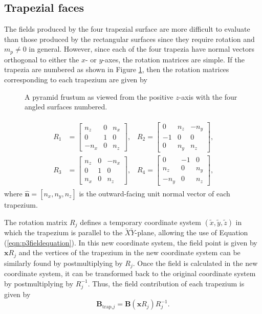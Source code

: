 \subsection{Trapezial faces}\label{sec:p3trapFaces}
The fields produced by the four trapezial surface are more difficult to evaluate than those produced by the rectangular surfaces since they require rotation and \(m_p \neq 0\) in general. However, since each of the four trapezia have normal vectors orthogonal to either the \(x\)- or \(y\)-axes, the rotation matrices are simple. If the trapezia are numbered as shown in Figure \ref{fig:p3numberedTrapezia}, then the rotation matrices corresponding to each trapezium are given by
\begin{figure}
	\centering
	
	\caption{A pyramid frustum as viewed from the positive \(z\)-axis with the four angled surfaces numbered.}
	\label{fig:p3numberedTrapezia}
\end{figure}
\begin{align}
\begin{split}
R_1 &= \begin{bmatrix}
n_z & 0 & n_x \\
0 & 1 & 0 \\
-n_x & 0 & n_z
\end{bmatrix} \text{,}
\quad
R_2 = \begin{bmatrix}
0 & n_z & -n_y \\
-1 & 0 & 0 \\
0 & n_y & n_z
\end{bmatrix} \text{,} \\[3mm]
R_3 &= \begin{bmatrix}
n_z & 0 & -n_x \\
0 & 1 & 0 \\
n_x & 0 & n_z
\end{bmatrix} \text{,}
\quad
R_4 = \begin{bmatrix}
0 & -1 & 0 \\
n_z & 0 & n_y \\
-n_y & 0 & n_z
\end{bmatrix} \text{,}
\end{split}
\end{align}
where \(\hat{\mathbf{n}} = \left[ n_x, n_y, n_z \right]\) is the outward-facing unit normal vector of each trapezium.

The rotation matrix \(R_j\) defines a temporary coordinate system \(\left( \tilde{x}, \tilde{y}, \tilde{z} \right)\) in which the trapezium is parallel to the \(\tilde{X}\tilde{Y}\)-plane, allowing the use of Equation (\ref{eqn:p3fieldequation}). In this new coordinate system, the field point is given by \(\mathbf{x} R_j\) and the vertices of the trapezium in the new coordinate system can be similarly found by postmultiplying by \(R_j\). Once the field is calculated in the new coordinate system, it can be transformed back to the original coordinate system by postmultiplying by \(R_j^{-1}\). Thus, the field contribution of each trapezium is given by
\begin{equation}
\mathbf{B}_{\text{trap,}j} = \mathbf{B}\left( \mathbf{x} R_j \right) R_j^{-1} \text{.}
\end{equation}